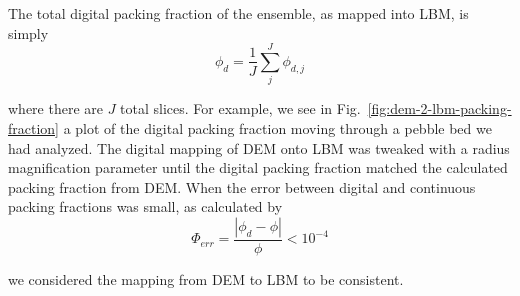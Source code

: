 The total digital packing fraction of the ensemble, as mapped into LBM, is simply
\begin{equation}
	\phi_d = \frac{1}{J}\sum_j^J\phi_{d,j}
\end{equation}

where there are $J$ total slices. For example, we see in Fig.~\ref{fig:dem-2-lbm-packing-fraction} a plot of the digital packing fraction moving through a pebble bed we had analyzed. The digital mapping of DEM onto LBM was tweaked with a radius magnification parameter until the digital packing fraction matched the calculated packing fraction from DEM. When the error between digital and continuous packing fractions was small, as calculated by
\begin{equation}
	\Phi_{err} = \frac{|\phi_d - \phi|}{\phi} < 10^{-4}
\end{equation}

we considered the mapping from DEM to LBM to be consistent.
\FloatBarrier